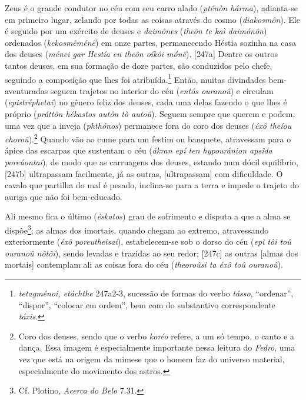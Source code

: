 Zeus é o grande condutor no céu com seu carro alado (\emph{ptênòn
hárma}), adianta-se em primeiro lugar, zelando por todas as coisas
através do cosmo (\emph{diakosmôn}). Ele é seguido por um exército de
deuses e \emph{daimônes} (\emph{theôn te kaì daimónôn}) ordenados
(\emph{kekosmêménê}) em onze partes, permanecendo Héstia sozinha na casa
dos deuses (\emph{ménei gar Hestía en theôn oíkôi mónê}). {[}247a{]}
Dentre os outros tantos deuses, em sua formação de doze partes, são
conduzidos pelo chefe, seguindo a composição que lhes foi
atribuída.\footnote{\emph{tetagménoi, etáchthe} 247a2-3, sucessão de
  formas do verbo \emph{tásso}, ``ordenar'', ``dispor'', ``colocar em
  ordem'', bem com do substantivo correspondente \emph{táxis}.} Então,
muitas divindades bem-aventuradas seguem trajetos no interior do céu
(\emph{entós ouranoû}) e circulam (\emph{epistréphetai}) no gênero feliz
dos deuses, cada uma delas fazendo o que lhes é próprio (\emph{práttôn
hékastos autôn tò autoû}). Seguem sempre que querem e podem, uma vez que
a inveja (\emph{phthónos}) permanece fora do coro dos deuses (\emph{éxô
theíou choroû}).\footnote{Coro dos deuses, sendo que o verbo
  \emph{koréo} refere, a um só tempo, o canto e a dança. Essa imagem é
  especialmente importante nessa leitura do \emph{Fedro}, uma vez que
  está na origem da mimese que o homem faz do universo material,
  especialmente do movimento dos astros.} Quando vão ao cume para um
festim ou banquete, atravessam para o ápice das escarpas que sustentam o
céu (\emph{ákran epí ten hypouránion apsîda poreúontai}), de modo que as
carruagens dos deuses, estando num dócil equilíbrio, {[}247b{]}
ultrapassam facilmente, já as outras, {[}ultrapassam{]} com dificuldade.
O cavalo que partilha do mal é pesado, inclina-se para a terra e impede
o trajeto do auriga que não foi bem-educado.

Ali mesmo fica o último (\emph{éskatos}) grau de sofrimento e disputa a
que a alma se dispõe\footnote{Cf. Plotino, \emph{Acerca do Belo} 7.31.};
as almas dos imortais, quando chegam ao extremo, atravessando
exteriormente (\emph{éxô poreutheîsai}), estabelecem-se sob o dorso do
céu (\emph{epì tôi toû ouranoû nôtôi}), sendo levadas e trazidas ao seu
redor; {[}247c{]} as outras {[}almas dos mortais{]} contemplam ali as
coisas fora do céu (\emph{theoroûsi ta éxô toû ouranoû}).

